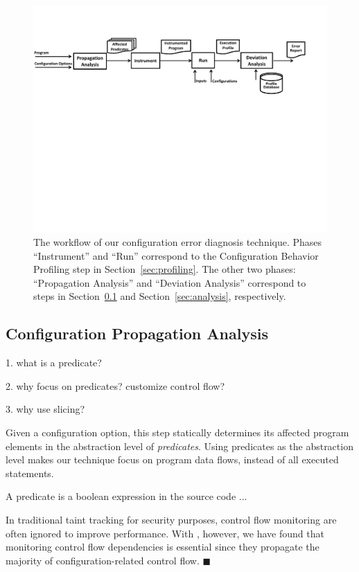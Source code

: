\begin{figure}[!]
  \centering
  \includegraphics[scale=0.600]{architecture}
  \vspace*{-2.0ex}\caption {{\label{fig:workflow} The workflow of our configuration error diagnosis technique.
Phases ``Instrument'' and ``Run'' correspond to the Configuration Behavior Profiling step in Section~\ref{sec:profiling}.
The other two phases: ``Propagation Analysis'' and ``Deviation Analysis'' correspond to steps in Section~\ref{sec:prop} and Section~\ref{sec:analysis}, respectively.
}}
\end{figure}

\subsection{Configuration Propagation Analysis}
\label{sec:prop}

1. what is a predicate?

2. why focus on predicates? customize control flow?

3. why use slicing?

Given a configuration option, this step statically determines its affected program
elements in the abstraction level of \textit{predicates}. Using predicates
as the abstraction level makes our technique focus on program data flows, instead
of all executed statements.

A predicate is a boolean expression in the source code ...

In traditional taint tracking for security purposes, control
flow monitoring are often ignored to improve performance.
With \ourtool, however, we have found that monitoring control flow
dependencies is essential since they propagate the majority of
configuration-related control flow. $\blacksquare$


